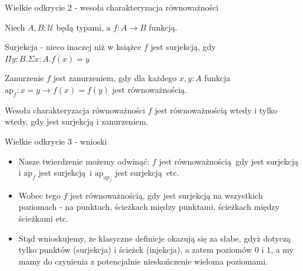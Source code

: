 \documentclass{beamer}
\newcommand{\U}{\mathcal{U}}
\begin{document}
\begin{frame}{Wielkie odkrycie 2 - wesoła charakteryzacja równoważności}

Niech $A, B : \U$ będą typami, a $f: A \to B$ funkcją.

\begin{block}{Surjekcja - nieco inaczej niż w książce}
$f$ jest surjekcją, gdy $\Pi y : B. \Sigma x : A. f(x) = y$
\end{block}

\begin{block}{Zanurzenie}
$f$ jest zanurzeniem, gdy dla każdego $x, y : A$ funkcja $\text{ap}_f : x = y \to f(x) = f(y)$ jest równoważnością.
\end{block}

\begin{block}{Wesoła charakteryzacja równoważności}
$f$ jest równoważnością wtedy i tylko wtedy, gdy jest surjekcją i zanurzeniem.
\end{block}

\end{frame}

\begin{frame}{Wielkie odkrycie 3 - wnioski}
\begin{itemize}
	\item Nasze twierdzenie możemy odwinąć: $f$ jest równoważnością gdy jest surjekcją i $\text{ap}_f$ jest surjekcją i $\text{ap}_{\text{ap}_f}$ jest surjekcją etc.
	\item Wobec tego $f$ jest równoważnością, gdy jest surjekcją na wszystkich poziomach - na punktach, ścieżkach między punktami, ścieżkach między ścieżkami etc.
	\item Stąd wnioskujemy, że klasyczne definicje okazują się za słabe, gdyż dotyczą tylko punktów (surjekcja) i ścieżek (injekcja), a zatem poziomów $0$ i $1$, a my mamy do czynienia z potencjalnie nieskończenie wieloma poziomami.
\end{itemize}
\end{frame}
\end{document}
